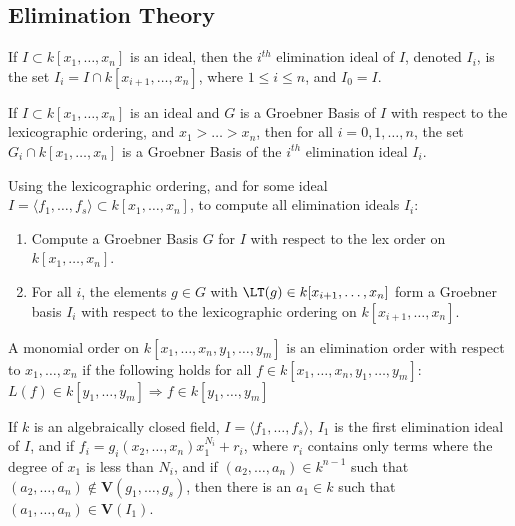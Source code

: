 \documentclass[crop=false,class=article,oneside]{standalone}
\begin{document}
    \subsection{Elimination Theory}
        \begin{definition}
            If $I\subset{k}[x_1,\hdots,x_{n}]$ is an ideal,
            then the $i^{th}$ elimination ideal of $I$,
            denoted $I_{i}$, is the set
            $I_{i}=I\cap{k}[x_{i+1},\hdots,x_{n}]$,
            where $1\leq{i}\leq{n}$, and $I_{0}=I$.
        \end{definition}
        \begin{theorem}
            If $I\subset k[x_1,\hdots ,x_n]$ is an ideal and
            $G$ is a Groebner Basis of $I$ with respect to the
            lexicographic ordering, and $x_1>\hdots > x_n$, then
            for all $i=0,1,\hdots,n$, the set
            $G_{i}\cap{k}[x_1,\hdots,x_n]$ is a Groebner Basis of
            the $i^{th}$ elimination ideal $I_{i}$.
        \end{theorem}
        \begin{remark}
            Using the lexicographic ordering, and for some ideal
            $I=\langle{f_{1}},\hdots,f_{s}\rangle%
               \subset{k}[x_1,\hdots ,x_n]$,
            to compute all elimination ideals $I_{i}$:
            \begin{enumerate}
                \item Compute a Groebner Basis $G$ for $I$ with
                      respect to the lex order on $k[x_1,\hdots,x_n]$.
                \item For all $i$, the elements $g\in G$ with
                      $\LT(g)\in{k}[x_{i+1},\hdots,x_{n}]$ form a
                      Groebner basis $I_{i}$ with respect to
                      the lexicographic ordering on
                      $k[x_{i+1},\hdots,x_n]$.
            \end{enumerate}
        \end{remark}
        \begin{definition}
            A monomial order on
            $k[x_{1},\hdots,x_{n},y_{1},\hdots,y_{m}]$
            is an elimination order with respect to
            $x_{1},\hdots,x_{n}$ if the following holds for
            all $f\in{k}[x_{1},\hdots,x_{n},y_{1},\hdots,y_{m}]$:
            $L(f)\in{k}[y_{1},\hdots,y_{m}]%
             \Rightarrow{f}\in{k}[y_{1},\hdots,y_{m}]$
        \end{definition}
        \begin{theorem}
            If $k$ is an algebraically closed field,
            $I=\langle{f_{1}},\hdots,f_{s}\rangle$, $I_{1}$ is
            the first elimination ideal of $I$, and if
            $f_{i}=g_{i}(x_{2},\hdots,x_{n})x_{1}^{N_i}+r_{i}$,
            where $r_{i}$ contains only terms where the degree
            of $x_{1}$ is less than $N_{i}$, and if
            $(a_{2},\hdots,a_{n})\in{k}^{n-1}$ such that
            $(a_{2},\hdots,a_{n})\notin%
             \mathbf{V}(g_{1},\hdots,g_{s})$,
             then there is an $a_1 \in k$ such that
             $(a_{1},\hdots,a_{n})\in\mathbf{V}(I_1)$.
        \end{theorem}
\end{document}
